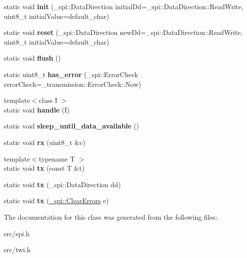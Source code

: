\begin{DoxyCompactItemize}
\item 
static void {\bfseries init} (\+\_\+spi\+::\+Data\+Direction initial\+Dd=\+\_\+spi\+::\+Data\+Direction\+::\+Read\+Write, uint8\+\_\+t initial\+Value=default\+\_\+char)\hypertarget{classSpiSlave_af970f2b3c7b0aa2e0c47d4848c39d2a7}{}\label{classSpiSlave_af970f2b3c7b0aa2e0c47d4848c39d2a7}

\item 
static void {\bfseries reset} (\+\_\+spi\+::\+Data\+Direction new\+Dd=\+\_\+spi\+::\+Data\+Direction\+::\+Read\+Write, uint8\+\_\+t initial\+Value=default\+\_\+char)\hypertarget{classSpiSlave_afa098a4ceeea041e478156d11774fa6e}{}\label{classSpiSlave_afa098a4ceeea041e478156d11774fa6e}

\item 
static void {\bfseries flush} ()\hypertarget{classSpiSlave_ae9aca59b22d840e5c0e9139efdd1e43d}{}\label{classSpiSlave_ae9aca59b22d840e5c0e9139efdd1e43d}

\item 
static uint8\+\_\+t {\bfseries has\+\_\+error} (\+\_\+spi\+::\+Error\+Check error\+Check=\+\_\+transmission\+::\+Error\+Check\+::\+Now)\hypertarget{classSpiSlave_a7598120960f7a9b117bae0a7efadd521}{}\label{classSpiSlave_a7598120960f7a9b117bae0a7efadd521}

\item 
{\footnotesize template$<$class I $>$ }\\static void {\bfseries handle} (I)\hypertarget{classSpiSlave_a6368b7175f34d500adfda15ea769d27d}{}\label{classSpiSlave_a6368b7175f34d500adfda15ea769d27d}

\item 
static void {\bfseries sleep\+\_\+until\+\_\+data\+\_\+available} ()\hypertarget{classSpiSlave_a22ea4c2e7dd73a8a3d4421ef1988fb6a}{}\label{classSpiSlave_a22ea4c2e7dd73a8a3d4421ef1988fb6a}

\item 
static void {\bfseries rx} (uint8\+\_\+t \&c)\hypertarget{classSpiSlave_a56024a5c65f1621d6d6878442c63d0f8}{}\label{classSpiSlave_a56024a5c65f1621d6d6878442c63d0f8}

\item 
{\footnotesize template$<$typename T $>$ }\\static void {\bfseries tx} (const T \&t)\hypertarget{classSpiSlave_a8b4d0097a955d25bed56bd828c01c2a3}{}\label{classSpiSlave_a8b4d0097a955d25bed56bd828c01c2a3}

\item 
static void {\bfseries tx} (\+\_\+spi\+::\+Data\+Direction dd)\hypertarget{classSpiSlave_aaaf2c74fb0b8332bc76e669e21ffd959}{}\label{classSpiSlave_aaaf2c74fb0b8332bc76e669e21ffd959}

\item 
static void {\bfseries tx} (\hyperlink{class__transmission_1_1ClearErrors}{\+\_\+spi\+::\+Clear\+Errors} e)\hypertarget{classSpiSlave_ac7d9643f31fede2f24a49a4491e52732}{}\label{classSpiSlave_ac7d9643f31fede2f24a49a4491e52732}

\end{DoxyCompactItemize}


The documentation for this class was generated from the following files\+:\begin{DoxyCompactItemize}
\item 
src/spi.\+h\item 
src/twi.\+h\end{DoxyCompactItemize}
